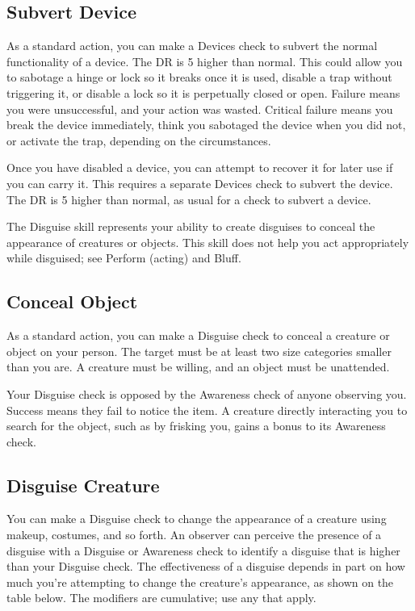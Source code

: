     \subsection{Subvert Device}
        As a standard action, you can make a Devices check to subvert the normal functionality of a device. The DR is 5 higher than normal. This could allow you to sabotage a hinge or lock so it breaks once it is used, disable a trap without triggering it, or disable a lock so it is perpetually closed or open. Failure means you were unsuccessful, and your action was wasted. Critical failure means you break the device immediately, think you sabotaged the device when you did not, or activate the trap, depending on the circumstances.

        Once you have disabled a device, you can attempt to recover it for later use if you can carry it. This requires a separate Devices check to subvert the device. The DR is 5 higher than normal, as usual for a check to subvert a device.

\newpage
{}
        The Disguise skill represents your ability to create disguises to conceal the appearance of creatures or objects. This skill does not help you act appropriately while disguised; see Perform (acting) and Bluff.

    \subsection{Conceal Object}
        As a standard action, you can make a Disguise check to conceal a creature or object on your person.
        The target must be at least two size categories smaller than you are.
        A creature must be willing, and an object must be unattended.

        Your Disguise check is opposed by the Awareness check of anyone observing you.
        Success means they fail to notice the item. A creature directly interacting you to search for the object, such as by frisking you, gains a  bonus to its Awareness check.

    \subsection{Disguise Creature}\label{Disguise Creature}
        You can make a Disguise check to change the appearance of a creature using makeup, costumes, and so forth. An observer can perceive the presence of a disguise with a Disguise or Awareness check to identify a disguise that is higher than your Disguise check. The effectiveness of a disguise depends in part on how much you're attempting to change the creature's appearance, as shown on the table below. The modifiers are cumulative; use any that apply.

